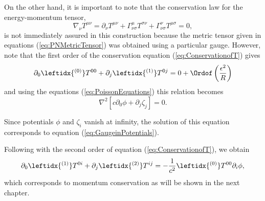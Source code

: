 On the other hand, it is important to note that the conservation law for the energy-momentum tensor, 
\begin{equation}
\nabla_\nu T^{\mu \nu} = \partial_\nu T^{\mu \nu} + \Gamma^\mu _{\nu \sigma} T^{\sigma \nu} + \Gamma^\nu _{\nu \sigma} T^{\mu \sigma } = 0, \label{eq:ConservationofT}
\end{equation}
is not immediately assured in this construction because the metric tensor given in equations (\ref{eq:PNMetricTensor}) was obtained using a particular gauge. However, note that the first order of the conservation equation (\ref{eq:ConservationofT}) gives
\begin{equation}
\partial_0 \leftidx{^{(0)}} T^{00} + \partial_j \leftidx{^{(1)}} T^{0j} = 0 +\Ordof \left( \frac{\epsilon^2}{R}\right)
\end{equation}
and using the equations (\ref{eq:PoissonEquations}) this relation becomes
\begin{equation}
\nabla^2 \left[  c \partial_0 \phi + \partial_j \zeta_j  \right] = 0.
\end{equation}

Since potentials $\phi$ and $\zeta_i$ vanish at infinity, the solution of this equation corresponds to equation (\ref{eq:GaugeinPotentials}).

Following with the second order of equation (\ref{eq:ConservationofT}), we obtain
\begin{equation}
\partial_0 \leftidx{^{(1)}} T^{0i} + \partial_j \leftidx{^{(2)}} T^{ij} = -\frac{1}{c^2}  \leftidx{^{(0)}} T^{00} \partial_i \phi , 
\end{equation}
which corresponds to momentum conservation as will be shown in the next chapter.
